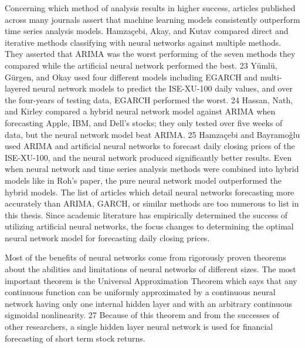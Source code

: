 \documentclass[../main.tex]{subfiles}
\begin{document}
    Concerning which method of analysis results in higher success, articles published across many journals assert that machine learning models consistently outperform time series analysis models.
    Hamzaçebi, Akay, and Kutav compared direct and iterative methods classifying with neural networks against multiple methods.
    They asserted that ARIMA was the worst performing of the seven methods they compared while the artificial neural network performed the best. 23
    Yümlü, Gürgen, and Okay used four different models including EGARCH and multi-layered neural network models to predict the ISE-XU-100 daily values, and over the four-years of testing data, EGARCH performed the worst. 24
    Hassan, Nath, and Kirley compared a hybrid neural network model against ARIMA when forecasting Apple, IBM, and
    Dell’s stocks; they only tested over five weeks of data, but the neural network model beat ARIMA. 25
    Hamzaçebi and Bayramoǧlu used ARIMA and artificial neural networks to forecast daily closing prices of the ISE-XU-100, and the neural network produced significantly better results.
    Even when neural network and time series analysis methods were combined into hybrid models like in Roh’s paper, the pure neural network model outperformed the hybrid models.
    The list of articles which detail neural networks forecasting more accurately than ARIMA, GARCH, or similar methods are too numerous to list in this thesis.
    Since academic literature has empirically determined the success of utilizing artificial neural networks, the focus changes to determining the optimal neural network model for forecasting daily closing prices.

    Most of the benefits of neural networks come from rigorously proven theorems about the abilities and limitations of neural networks of different sizes.
    The most important theorem is the Universal Approximation Theorem which says that any continuous function can be uniformly approximated by a continuous neural network having only one internal hidden layer and with an arbitrary continuous sigmoidal nonlinearity. 27
    Because of this theorem and from the successes of other researchers, a single hidden layer neural network is used for financial forecasting of short term stock returns.
\end{document}
